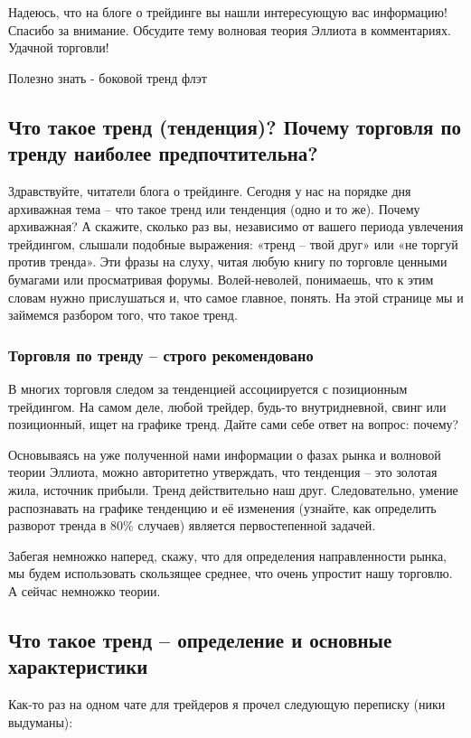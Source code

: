 \documentclass[a5paper]{article}
\begin{document}
Надеюсь, что на блоге о трейдинге вы нашли интересующую вас информацию! Спасибо за внимание. Обсудите тему волновая теория Эллиота в комментариях. Удачной торговли!


Полезно знать - боковой тренд флэт

\subsection{Что такое тренд (тенденция)? Почему торговля по тренду
  наиболее предпочтительна?}

Здравствуйте, читатели блога о трейдинге. Сегодня у нас на порядке дня
архиважная тема – что такое тренд или тенденция (одно и то же). Почему
архиважная? А скажите, сколько раз вы, независимо от вашего периода
увлечения трейдингом, слышали подобные выражения: «тренд – твой друг»
или «не торгуй против тренда». Эти фразы на слуху, читая любую книгу
по торговле ценными бумагами или просматривая форумы. Волей-неволей,
понимаешь, что к этим словам нужно прислушаться и, что самое главное,
понять. На этой странице мы и займемся разбором того, что такое тренд.

\subsubsection{Торговля по тренду – строго рекомендовано }

В многих торговля следом за тенденцией ассоциируется с позиционным трейдингом. На самом деле, любой трейдер, будь-то внутридневной, свинг или позиционный, ищет на графике тренд. Дайте сами себе ответ на вопрос: почему?

Основываясь на уже полученной нами информации о фазах рынка и волновой теории Эллиота, можно авторитетно утверждать, что тенденция – это золотая жила, источник прибыли. Тренд действительно наш друг. Следовательно, умение распознавать на графике тенденцию и её изменения (узнайте, как определить разворот тренда в 80\% случаев) является первостепенной задачей.

Забегая немножко наперед, скажу, что для определения направленности
рынка, мы будем использовать скользящее среднее, что очень упростит
нашу торговлю. А сейчас немножко теории.

\subsection{Что такое тренд – определение и основные характеристики}

Как-то раз на одном чате для трейдеров я прочел следующую переписку (ники выдуманы):
\end{document}
